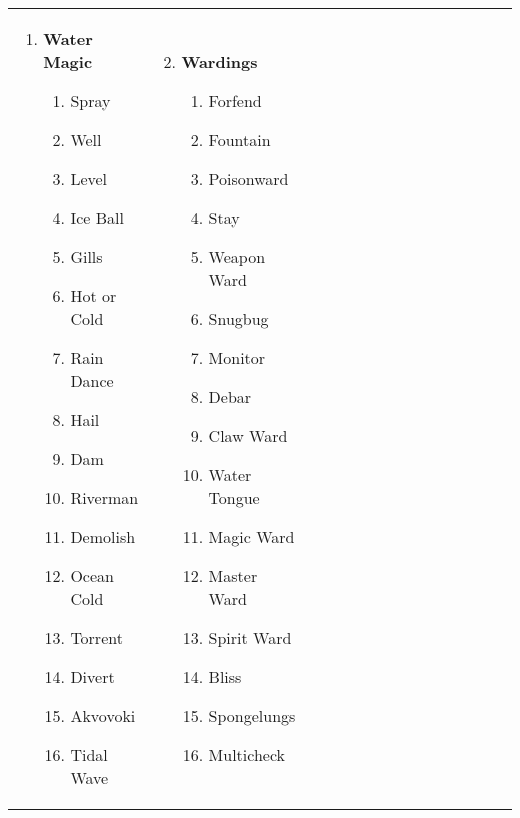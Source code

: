 \renewcommand{\labelenumii}{\arabic{enumii}.}
\begin{tabular}{@{} p{0.25\linewidth} p{0.25\linewidth} p{0.25\linewidth} p{0.25\linewidth}}
\begin{enumerate}
	\item \textbf{Water Magic}
	\begin{enumerate}
		\item Spray
		\item Well
		\item Level
		\item Ice Ball
		\item Gills
		\item Hot or Cold
		\item Rain Dance
		\item Hail
		\item Dam
		\item Riverman
		\item Demolish
		\item Ocean Cold
		\item Torrent
		\item Divert
		\item Akvovoki
		\item Tidal Wave
	\end{enumerate}
\end{enumerate} &
\begin{enumerate}
	\setcounter{enumi}{1}
	\item \textbf{Wardings}
	\begin{enumerate}
		\item Forfend
		\item Fountain
		\item Poisonward
		\item Stay
		\item Weapon Ward
		\item Snugbug
		\item Monitor
		\item Debar
		\item Claw Ward
		\item Water Tongue
		\item Magic Ward
		\item Master Ward
		\item Spirit Ward
		\item Bliss
		\item Spongelungs
		\item Multicheck
	\end{enumerate}
\end{enumerate} &

\end{tabular}
